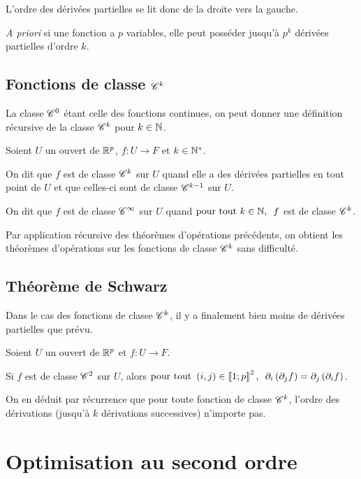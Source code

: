 L'ordre des dérivées partielles se lit donc de la droite vers la gauche.

\textit{A priori} si une fonction a \(p\) variables, elle peut posséder jusqu'à \(p^k\) dérivées partielles d'ordre \(k\).

\subsection{Fonctions de classe \(\mathscr{C}^{k}\)}

La classe \(\mathscr{C}^{0}\) étant celle des fonctions continues, on peut donner une définition récursive de la classe \(\mathscr{C}^{k}\) pour \(k\in\mathbb{N}\).

\begin{defi}
Soient \(U\) un ouvert de \(\mathbb{R}^p\), \(f:U\to F\) et \(k\in\mathbb{N}^*\).

On dit que \(f\) est de classe \(\mathscr{C}^{k}\) sur \(U\) quand elle a des dérivées partielles en tout point de \(U\) et que celles-ci sont de classe \(\mathscr{C}^{k-1}\) sur \(U\).

On dit que \(f\) est de classe \(\mathscr{C}^{\infty}\) sur \(U\) quand \(\quantifs{\tpt k\in\N}f\) est de classe \(\mathscr{C}^{k}\).
\end{defi}

Par application récursive des théorèmes d'opérations précédents, on obtient les théorèmes d'opérations sur les fonctions de classe \(\mathscr{C}^{k}\) sans difficulté.

\subsection{Théorème de Schwarz}

Dans le cas des fonctions de classe \(\mathscr{C}^{k}\), il y a finalement bien moins de dérivées partielles que prévu.

\begin{theo}
Soient \(U\) un ouvert de \(\mathbb{R}^p\) et \(f:U\to F\).

Si \(f\) est de classe \(\mathscr{C}^{2}\) sur \(U\), alors \(\quantifs{\tpt\paren{i,j}\in\interventierii{1}{p}^2}\pdif{i}\paren{\pdif{j}f}=\pdif{j}\paren{\pdif{i}f}\).
\end{theo}

On en déduit par récurrence que pour toute fonction de classe \(\mathscr{C}^{k}\), l'ordre des dérivations (jusqu'à \(k\) dérivations successives) n'importe pas.

\section{Optimisation au second ordre}

